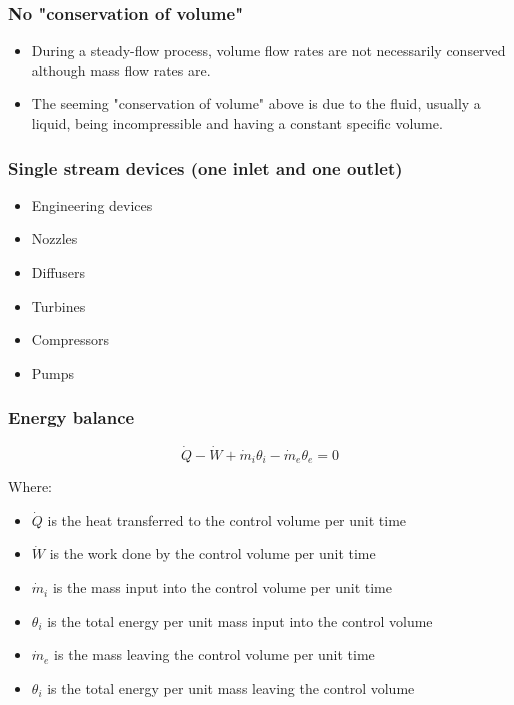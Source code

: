 \documentclass[11pt]{article}
\begin{document}
\subsubsection{No "conservation of volume"}
\label{sec:orgc75311d}
\begin{itemize}
\item During a steady-flow process, volume flow rates are not necessarily conserved although mass flow rates are.
\item The seeming "conservation of volume" above is due to the fluid, usually a liquid, being incompressible and having a constant specific volume.
\end{itemize}
\subsubsection{Single stream devices (one inlet and one outlet)}
\label{sec:org8fdcf13}
\begin{itemize}
\item Engineering devices
\item Nozzles
\item Diffusers
\item Turbines
\item Compressors
\item Pumps
\end{itemize}

\newpage
\subsubsection{Energy balance}
\label{sec:orge69b61d}
\[\dot{Q} - \dot{W} + \dot{m}_i \theta_i - \dot{m}_e \theta_e = 0 \tag{1}\]

Where:
\begin{itemize}
\item \(\dot{Q}\) is the heat transferred to the control volume per unit time
\item \(\dot{W}\) is the work done by the control volume per unit time
\item \(\dot{m}_i\) is the mass input into the control volume per unit time
\item \(\theta_i\) is the total energy per unit mass input into the control volume
\item \(\dot{m}_e\) is the mass leaving the control volume per unit time
\item \(\theta_i\) is the total energy per unit mass leaving the control volume
\end{itemize}
\end{document}
